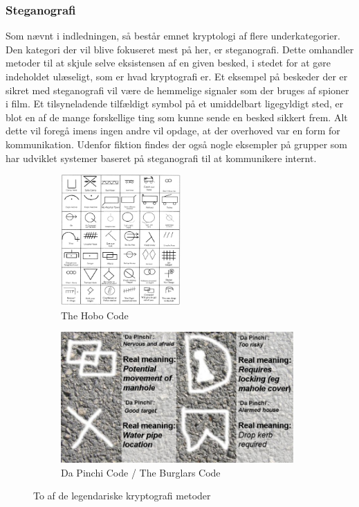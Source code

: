 \subsubsection{Steganografi}
Som nævnt i indledningen, så består emnet kryptologi af flere underkategorier. Den kategori der vil blive fokuseret mest på her, er steganografi. Dette omhandler metoder til at skjule selve eksistensen af en given besked, i stedet for at gøre indeholdet ulæseligt, som er hvad kryptografi er.\cite{MeningOfSteganografi} Et eksempel på beskeder der er sikret med steganografi vil være de hemmelige signaler som der bruges af spioner i film. Et tilsyneladende tilfældigt symbol på et umiddelbart ligegyldigt sted, er blot en af de mange forskellige ting som kunne sende en besked sikkert frem. Alt dette vil foregå imens ingen andre vil opdage, at der overhoved var en form for kommunikation. Udenfor fiktion findes der også nogle eksempler på grupper som har udviklet systemer baseret på steganografi til at kommunikere internt.
\begin{figure}[H]
    \begin{subfigure}{0.5\textwidth}
    \includegraphics[width=0.9\linewidth, height=5cm]{Projectdoc/Problemanalyse/Illustrationer/hobo-glyphs-code.jpg} 
    \caption{The Hobo Code}
    \label{fig:hobocode}
    \end{subfigure}
    \begin{subfigure}{0.5\textwidth}
    \includegraphics[width=0.9\linewidth, height=5cm]{Projectdoc/Problemanalyse/Illustrationer/BurglarsCode.jpg}
    \caption{Da Pinchi Code / The Burglars Code}
    \label{fig:burglarscode}
    \end{subfigure}
    \caption{To af de legendariske kryptografi metoder}
    \label{fig:legendscode}
\end{figure}
